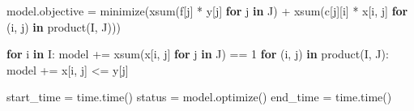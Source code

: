 \documentclass[
  letterpaper,
  DIV=11,
  numbers=noendperiod]{scrartcl}
\newenvironment{Shaded}{\begin{snugshade}}{\end{snugshade}}
\newcommand{\ControlFlowTok}[1]{\textcolor[rgb]{0.00,0.23,0.31}{\textbf{#1}}}
\newcommand{\DecValTok}[1]{\textcolor[rgb]{0.68,0.00,0.00}{#1}}
\newcommand{\KeywordTok}[1]{\textcolor[rgb]{0.00,0.23,0.31}{\textbf{#1}}}
\newcommand{\NormalTok}[1]{\textcolor[rgb]{0.00,0.23,0.31}{#1}}
\newcommand{\OperatorTok}[1]{\textcolor[rgb]{0.37,0.37,0.37}{#1}}
\begin{document}
\begin{Shaded}
\begin{Highlighting}[]
\NormalTok{    model.objective }\OperatorTok{=}\NormalTok{ minimize(xsum(f[j] }\OperatorTok{*}\NormalTok{ y[j] }\ControlFlowTok{for}\NormalTok{ j }\KeywordTok{in}\NormalTok{ J) }\OperatorTok{+}\NormalTok{ xsum(c[j][i] }\OperatorTok{*}\NormalTok{ x[i, j] }\ControlFlowTok{for}\NormalTok{ (i, j) }\KeywordTok{in}\NormalTok{ product(I, J)))}
    
    \ControlFlowTok{for}\NormalTok{ i }\KeywordTok{in}\NormalTok{ I:}
\NormalTok{        model }\OperatorTok{+=}\NormalTok{ xsum(x[i, j] }\ControlFlowTok{for}\NormalTok{ j }\KeywordTok{in}\NormalTok{ J) }\OperatorTok{==} \DecValTok{1}
    \ControlFlowTok{for}\NormalTok{ (i, j) }\KeywordTok{in}\NormalTok{ product(I, J):}
\NormalTok{        model }\OperatorTok{+=}\NormalTok{ x[i, j] }\OperatorTok{\textless{}=}\NormalTok{ y[j]}
    
\NormalTok{    start\_time }\OperatorTok{=}\NormalTok{ time.time()}
\NormalTok{    status }\OperatorTok{=}\NormalTok{ model.optimize()}
\NormalTok{    end\_time }\OperatorTok{=}\NormalTok{ time.time()}
    

\end{Highlighting}
\end{Shaded}
\end{document}
